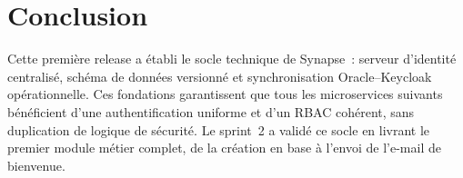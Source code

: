 \section{Conclusion}

Cette première release a établi le socle technique de Synapse~: serveur d’identité
centralisé, schéma de données versionné et synchronisation Oracle--Keycloak
opérationnelle. Ces fondations garantissent que tous les microservices suivants
bénéficient d’une authentification uniforme et d’un RBAC cohérent, sans duplication
de logique de sécurité. Le sprint~2 a validé ce socle en livrant le premier module
métier complet, de la création en base à l’envoi de l’e-mail de bienvenue.
